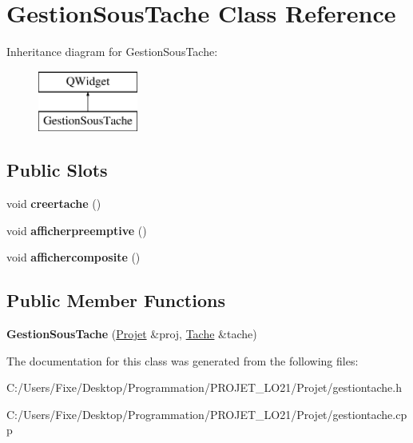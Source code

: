 \hypertarget{class_gestion_sous_tache}{}\section{Gestion\+Sous\+Tache Class Reference}
\label{class_gestion_sous_tache}
Inheritance diagram for Gestion\+Sous\+Tache\+:\begin{figure}[H]
\begin{center}
\leavevmode
\includegraphics[height=2.000000cm]{class_gestion_sous_tache}
\end{center}
\end{figure}
\subsection*{Public Slots}
\begin{DoxyCompactItemize}
\item 
\hypertarget{class_gestion_sous_tache_a4a70d5e3f11b0d421a515eaf7e240a90}{}void {\bfseries creertache} ()\label{class_gestion_sous_tache_a4a70d5e3f11b0d421a515eaf7e240a90}

\item 
\hypertarget{class_gestion_sous_tache_a7323835b515f66c17026b6fbae100dea}{}void {\bfseries afficherpreemptive} ()\label{class_gestion_sous_tache_a7323835b515f66c17026b6fbae100dea}

\item 
\hypertarget{class_gestion_sous_tache_a691c02c3b0cb75a2d333435268aeab19}{}void {\bfseries affichercomposite} ()\label{class_gestion_sous_tache_a691c02c3b0cb75a2d333435268aeab19}

\end{DoxyCompactItemize}
\subsection*{Public Member Functions}
\begin{DoxyCompactItemize}
\item 
\hypertarget{class_gestion_sous_tache_aa43b02eca767fe788647ad9ee98f52e4}{}{\bfseries Gestion\+Sous\+Tache} (\hyperlink{class_projet}{Projet} \&proj, \hyperlink{class_tache}{Tache} \&tache)\label{class_gestion_sous_tache_aa43b02eca767fe788647ad9ee98f52e4}

\end{DoxyCompactItemize}


The documentation for this class was generated from the following files\+:\begin{DoxyCompactItemize}
\item 
C\+:/\+Users/\+Fixe/\+Desktop/\+Programmation/\+P\+R\+O\+J\+E\+T\+\_\+\+L\+O21/\+Projet/gestiontache.\+h\item 
C\+:/\+Users/\+Fixe/\+Desktop/\+Programmation/\+P\+R\+O\+J\+E\+T\+\_\+\+L\+O21/\+Projet/gestiontache.\+cpp\end{DoxyCompactItemize}

